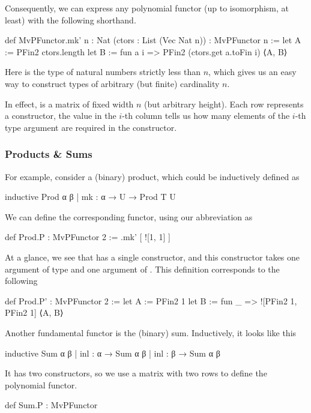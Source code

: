 \documentclass[titlepage]{report}
\begin{document}
Consequently, we can express any polynomial functor (up to isomorphism, at least) with the following
shorthand.

\begin{leancode}
    def MvPFunctor.mk' {n : Nat} (ctors : List (Vec Nat n)) 
        : MvPFunctor n
    :=  let A := PFin2 ctors.length
        let B := fun a i => PFin2 (ctors.get a.toFin i)
        ⟨A, B⟩
\end{leancode}

Here  is the type of natural numbers strictly less than $n$, which gives us an easy
way to construct types of arbitrary (but finite) cardinality $n$.

In effect,  is a matrix of fixed width $n$ (but arbitrary height). 
Each row represents a constructor, the value in the $i$-th column tells us how many elements of the 
$i$-th type argument are required in the constructor.

\subsubsection*{Products \& Sums}
For example, consider a (binary) product, which could be inductively defined as 
\begin{leancode}
    inductive Prod α β
      | mk : α → U → Prod T U
\end{leancode}

We can define the corresponding functor, using our abbreviation as
\begin{leancode}
    def Prod.P : MvPFunctor 2 
      := .mk' [
        ![1, 1]
      ]
\end{leancode}
At a glance, we see that  has a single constructor, and this constructor takes one
argument of type  and one argument of .
This definition corresponds to the following
\begin{leancode}
    def Prod.P' : MvPFunctor 2 
      :=  let A := PFin2 1
          let B := fun _ => ![PFin2 1, PFin2 1]
          ⟨A, B⟩
\end{leancode}



Another fundamental functor is the (binary) sum. Inductively, it looks like this
\begin{leancode}
    inductive Sum α β 
      | inl : α → Sum α β 
      | inl : β → Sum α β 
\end{leancode}
It has two constructors, so we use a matrix with two rows to define the polynomial functor.
\begin{leancode}
    def Sum.P : MvPFunctor
\end{leancode}
\end{document}
